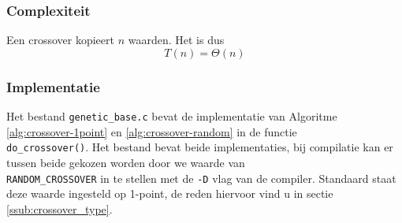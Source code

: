 \subsubsection{Complexiteit}
\label{sub:alg_crossover_compl}
Een crossover kopieert $n$ waarden. Het is dus \[T(n)=\Theta(n)\]




\subsubsection{Implementatie}
Het bestand \texttt{genetic\_base.c} bevat de implementatie van Algoritme \ref{alg:crossover-1point} en \ref{alg:crossover-random} in de functie 
\\ \texttt{do\_crossover()}. 
Het bestand bevat beide implementaties, bij compilatie kan er tussen beide gekozen worden door we waarde van \\ \texttt{RANDOM\_CROSSOVER} in te stellen met de \texttt{-D} vlag van de compiler. Standaard staat deze waarde ingesteld op 1-point, de reden hiervoor vind u in sectie \ref{ssub:crossover_type}.


%